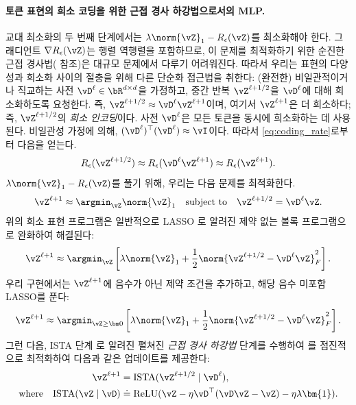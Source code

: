 \documentclass[../../book-main_ko.tex]{subfiles}
\begin{document}
\paragraph{토큰 표현의 희소 코딩을 위한 근접 경사 하강법으로서의 MLP.} 교대 최소화의 두 번째 단계에서는 $\lambda \norm{\vZ}_{1} - R_{\epsilon}(\vZ)$를 최소화해야 한다. 그래디언트 \(\nabla R_{\epsilon}(\vZ)\)는 행렬 역행렬을 포함하므로, 이 문제를 최적화하기 위한 순진한 근접 경사법( 참조)은 대규모 문제에서 다루기 어려워진다. %
따라서 우리는 표현의 다양성과 희소화 사이의 절충을 위해 다른 단순화 접근법을 취한다: (완전한) 비일관적이거나 직교하는 사전 $\vD^{\ell} \in \bR^{d \times d}$을 가정하고, 중간 반복 \(\vZ^{\ell + 1/2}\)을 \(\vD^{\ell}\)에 대해 희소화하도록 요청한다. 즉, $\vZ^{\ell + 1/2} \approx \vD^{\ell} \vZ^{\ell + 1}$이며, 여기서 $\vZ^{\ell + 1}$은 더 희소하다; 즉, \(\vZ^{\ell + 1/2}\)의 \textit{희소 인코딩}이다. 사전 \(\vD^{\ell}\)은 모든 토큰을 동시에 희소화하는 데 사용된다.
비일관성 가정에 의해, $(\vD^{\ell})^\top(\vD^{\ell}) \approx \vI$이다. 따라서 \eqref{eq:coding_rate}로부터 다음을 얻는다.
\begin{equation}
    R_{\epsilon}(\vZ^{\ell + 1/2}) \approx R_{\epsilon}(\vD^{\ell}\vZ^{\ell + 1}) \approx R_{\epsilon}(\vZ^{\ell + 1}).
\end{equation}  
$\lambda \norm{\vZ}_{1} - R_{\epsilon}(\vZ)$를 풀기 위해, 우리는 다음 문제를 최적화한다.
\begin{align*}
       \vZ^{\ell + 1} \approx \argmin_{\vZ}  \norm{\vZ}_1 \quad \mbox{subject to} \quad \vZ^{\ell + 1/2} = \vD^{\ell}\vZ.
\end{align*}
{위의 희소 표현 프로그램은 일반적으로 LASSO \citep{Wright-Ma-2022}로 알려진 제약 없는 볼록 프로그램으로 완화하여 해결된다:}
\begin{equation}
    \vZ^{\ell + 1} \approx \argmin_{\vZ} \left[\lambda \norm{\vZ}_1 + \frac{1}{2}\norm{\vZ^{\ell + 1/2} - \vD^{\ell} \vZ}_F^2 \right].
\end{equation}
우리 구현에서는 $\vZ^{\ell + 1}$에 음수가 아닌 제약 조건을 추가하고, 해당 음수 미포함 LASSO를 푼다:
\begin{equation}
    \vZ^{\ell + 1} \approx \argmin_{\vZ \geq \bm 0} \left[\lambda\norm{\vZ}_1 + \frac{1}{2}\norm{\vZ^{\ell + 1/2} - \vD^{\ell} \vZ}_{F}^{2}\right].
    \label{eq:sparse-nonnegative}
\end{equation}
그런 다음, ISTA 단계 \citep{beck2009fast}로 알려진 펼쳐진 {\em 근접 경사 하강법} 단계를 수행하여 를 점진적으로 최적화하여 다음과 같은 업데이트를 제공한다:
\begin{align}\label{eq:ista-block}
    \vZ^{\ell + 1} 
    &= \mathrm{ISTA}({\vZ^{\ell + 1/2} \mid \vD^{\ell}}), \\
    \text{where} \quad \mathrm{ISTA}({\vZ \mid \vD}) 
    &\doteq \operatorname{ReLU}(\vZ - \eta \vD^\top(\vD\vZ - \vZ) - \eta \lambda \bm{1}).
\end{align}
\end{document}
